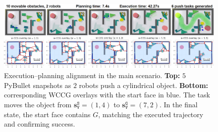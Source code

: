 \begin{figure}[t!]
  \centering
  \includegraphics[width=0.95\linewidth]{figures/sim_exp.png}
  \vspace{-0.15in}
\caption{Execution--planning alignment in the main scenario.
\textbf{Top:} $5$ PyBullet snapshots as $2$ robots push a cylindrical object.
\textbf{Bottom:} corresponding WCCG overlays with the start face in blue.
The task moves the object from \(\mathbf{s}^{\texttt{S}}_{\texttt{V}}=(1,4)\) to \(\mathbf{s}^{\texttt{G}}_{\texttt{V}}=(7,2)\).
In the final state,
the start face contains \(G\), matching the executed trajectory and confirming success.}
\vspace{-0.1in}
\label{fig:simloop}
\end{figure}

